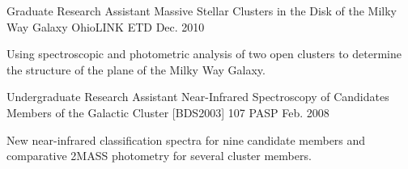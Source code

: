\begin{cventries}
  \cventry
    {Graduate Research Assistant} %
    {Massive Stellar Clusters in the Disk of the Milky Way Galaxy} %
    {OhioLINK ETD} %
    {Dec. 2010} %
    {
      \begin{cvcompactparagraph}
        Using spectroscopic and photometric analysis of two open clusters to determine the structure of the plane of the Milky Way Galaxy.
      \end{cvcompactparagraph}
    }

  \cventry
    {Undergraduate Research Assistant} %
    {Near-Infrared Spectroscopy of Candidates Members of the Galactic Cluster [BDS2003] 107} %
    {PASP} %
    {Feb. 2008} %
    {
      \begin{cvcompactparagraph}
        New near-infrared classification spectra for nine candidate members and comparative 2MASS photometry for several cluster members.
      \end{cvcompactparagraph}
    }

\end{cventries}
